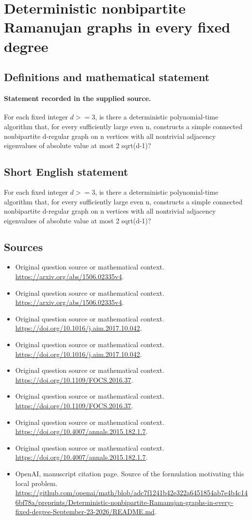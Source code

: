 \documentclass[11pt]{article}
\begin{document}
\section*{Deterministic nonbipartite Ramanujan graphs in every fixed degree}\label{statement}
\subsection{Definitions and mathematical statement}
\paragraph{Statement recorded in the supplied source.}
For each fixed integer $d>=3$, is there a deterministic polynomial-time algorithm that, for every sufficiently large even n, constructs a simple connected nonbipartite d-regular graph on n vertices with all nontrivial adjacency eigenvalues of absolute value at most 2 sqrt(d-1)?
\subsection{Short English statement}
For each fixed integer $d>=3$, is there a deterministic polynomial-time algorithm that, for every sufficiently large even n, constructs a simple connected nonbipartite d-regular graph on n vertices with all nontrivial adjacency eigenvalues of absolute value at most 2 sqrt(d-1)?
\subsection{Sources}
\begin{itemize}
\item[S1] Original question source or mathematical context.
\url{https://arxiv.org/abs/1506.02335v4}.
\item[S2] Original question source or mathematical context.
\url{https://arxiv.org/abs/1506.02335v4}.
\item[S3] Original question source or mathematical context.
\url{https://doi.org/10.1016/j.aim.2017.10.042}.
\item[S4] Original question source or mathematical context.
\url{https://doi.org/10.1016/j.aim.2017.10.042}.
\item[S5] Original question source or mathematical context.
\url{https://doi.org/10.1109/FOCS.2016.37}.
\item[S6] Original question source or mathematical context.
\url{https://doi.org/10.1109/FOCS.2016.37}.
\item[S7] Original question source or mathematical context.
\url{https://doi.org/10.4007/annals.2015.182.1.7}.
\item[S8] Original question source or mathematical context.
\url{https://doi.org/10.4007/annals.2015.182.1.7}.
\item[S9] OpenAI, manuscript citation page. Source of the formulation motivating this local problem.
\url{https://github.com/openai/math/blob/adc7f1241b42e322a6451854ab7e4b4c146bf78a/preprints/Deterministic-nonbipartite-Ramanujan-graphs-in-every-fixed-degree-September-23-2026/README.md}.
\end{itemize}
\end{document}
